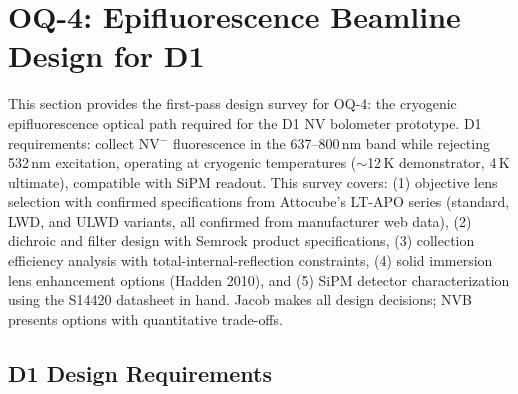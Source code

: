 %
%

\newcommand{\jacobdecision}[1]{\textcolor{blue}{\textbf{[Jacob decision required:} #1\textbf{]}}}

\section{OQ-4: Epifluorescence Beamline Design for D1}
\label{sec:oq4}

This section provides the first-pass design survey for OQ-4: the cryogenic
epifluorescence optical path required for the D1 NV bolometer prototype.
D1 requirements: collect NV$^-$ fluorescence in the 637--800\,nm band while
rejecting 532\,nm excitation, operating at cryogenic temperatures ($\sim$12\,K
demonstrator, 4\,K ultimate), compatible with SiPM readout.
This survey covers: (1) objective lens selection with confirmed specifications
from Attocube's LT-APO series (standard, LWD, and ULWD variants, all confirmed
from manufacturer web data), (2) dichroic and filter design with Semrock product
specifications, (3) collection efficiency analysis with total-internal-reflection
constraints, (4) solid immersion lens enhancement options (Hadden 2010), and
(5) SiPM detector characterization using the S14420 datasheet in hand.
Jacob makes all design decisions; NVB presents options with quantitative trade-offs.

\subsection{D1 Design Requirements}
\label{sec:oq4_requirements}

